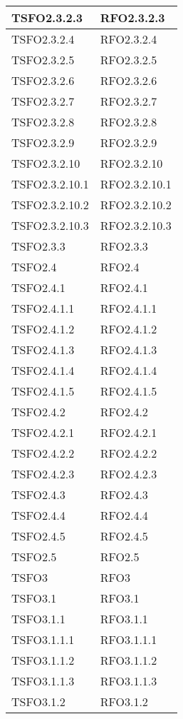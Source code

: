\begin{center}
\begin{longtable}{ | >{\centering\arraybackslash}m{5cm} | >{\centering\arraybackslash}m{5cm} | }
				TSFO2.3.2.3 & RFO2.3.2.3 \\ \hline
				TSFO2.3.2.4 & RFO2.3.2.4 \\ \hline
				TSFO2.3.2.5 & RFO2.3.2.5 \\ \hline
				TSFO2.3.2.6 & RFO2.3.2.6 \\ \hline
				TSFO2.3.2.7 & RFO2.3.2.7 \\ \hline
				TSFO2.3.2.8 & RFO2.3.2.8 \\ \hline
				TSFO2.3.2.9 & RFO2.3.2.9 \\ \hline
				TSFO2.3.2.10 & RFO2.3.2.10 \\ \hline
				TSFO2.3.2.10.1 & RFO2.3.2.10.1 \\ \hline
				TSFO2.3.2.10.2 & RFO2.3.2.10.2 \\ \hline
				TSFO2.3.2.10.3 & RFO2.3.2.10.3 \\ \hline
				TSFO2.3.3 & RFO2.3.3 \\ \hline
				TSFO2.4 & RFO2.4 \\ \hline
				TSFO2.4.1 & RFO2.4.1 \\ \hline
				TSFO2.4.1.1 & RFO2.4.1.1 \\ \hline
				TSFO2.4.1.2 & RFO2.4.1.2 \\ \hline
				TSFO2.4.1.3 & RFO2.4.1.3 \\ \hline
				TSFO2.4.1.4 & RFO2.4.1.4 \\ \hline
				TSFO2.4.1.5 & RFO2.4.1.5 \\ \hline
				TSFO2.4.2 & RFO2.4.2 \\ \hline
				TSFO2.4.2.1 & RFO2.4.2.1 \\ \hline
				TSFO2.4.2.2 & RFO2.4.2.2 \\ \hline
				TSFO2.4.2.3 & RFO2.4.2.3 \\ \hline
				TSFO2.4.3 & RFO2.4.3 \\ \hline
				TSFO2.4.4 & RFO2.4.4 \\ \hline
				TSFO2.4.5 & RFO2.4.5 \\ \hline
				TSFO2.5 & RFO2.5 \\ \hline
				TSFO3 & RFO3 \\ \hline
				TSFO3.1 & RFO3.1 \\ \hline
				TSFO3.1.1 & RFO3.1.1 \\ \hline
				TSFO3.1.1.1 & RFO3.1.1.1 \\ \hline
				TSFO3.1.1.2 & RFO3.1.1.2 \\ \hline
				TSFO3.1.1.3 & RFO3.1.1.3 \\ \hline
				TSFO3.1.2 & RFO3.1.2 \\ \hline

\end{longtable}
\end{center}
